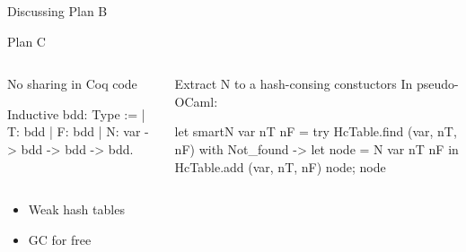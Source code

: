 \documentclass[9pt]{beamer}
\begin{document}
\begin{frame}{Discussing Plan B}
\end{frame}

\begin{frame}[fragile]{Plan C}
    \begin{columns}
  \begin{block}{No sharing in Coq code}
    \begin{coq}
      Inductive bdd: Type :=
      | T: bdd
      | F: bdd
      | N: var -> bdd -> bdd -> bdd.
    \end{coq}
  \end{block}
  \begin{block}{Extract N to a hash-consing constuctors}
    In pseudo-OCaml:
    \begin{ocaml}
      let smartN var nT nF =
        try HcTable.find (var, nT, nF)
        with Not_found ->
          let node = N var nT nF in
          HcTable.add (var, nT, nF) node;
          node
    \end{ocaml}
  \end{block}
  \end{columns}
  \begin{itemize}
  \item Weak hash tables
  \item GC for free
  \end{itemize}
\end{frame}
\end{document}
